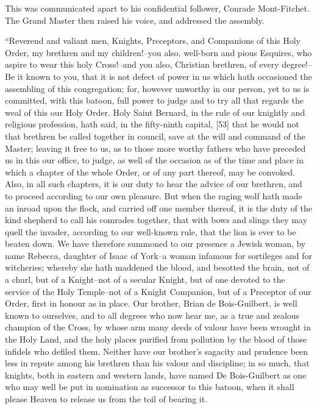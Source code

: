This was communicated apart to his confidential follower, Conrade
Mont-Fitchet. The Grand Master then raised his voice, and addressed the
assembly.

``Reverend and valiant men, Knights, Preceptors, and Companions of this
Holy Order, my brethren and my children!--you also, well-born and pious
Esquires, who aspire to wear this holy Cross!--and you also, Christian
brethren, of every degree!--Be it known to you, that it is not defect of
power in us which hath occasioned the assembling of this congregation;
for, however unworthy in our person, yet to us is committed, with this
batoon, full power to judge and to try all that regards the weal of this
our Holy Order. Holy Saint Bernard, in the rule of our knightly and
religious profession, hath said, in the fifty-ninth capital, {[}53{]}
that he would not that brethren be called together in council, save at
the will and command of the Master; leaving it free to us, as to those
more worthy fathers who have preceded us in this our office, to judge,
as well of the occasion as of the time and place in which a chapter of
the whole Order, or of any part thereof, may be convoked. Also, in all
such chapters, it is our duty to hear the advice of our brethren, and to
proceed according to our own pleasure. But when the raging wolf hath
made an inroad upon the flock, and carried off one member thereof, it is
the duty of the kind shepherd to call his comrades together, that with
bows and slings they may quell the invader, according to our well-known
rule, that the lion is ever to be beaten down. We have therefore
summoned to our presence a Jewish woman, by name Rebecca, daughter of
Isaac of York--a woman infamous for sortileges and for witcheries;
whereby she hath maddened the blood, and besotted the brain, not of a
churl, but of a Knight--not of a secular Knight, but of one devoted to
the service of the Holy Temple--not of a Knight Companion, but of a
Preceptor of our Order, first in honour as in place. Our brother, Brian
de Bois-Guilbert, is well known to ourselves, and to all degrees who now
hear me, as a true and zealous champion of the Cross, by whose arm many
deeds of valour have been wrought in the Holy Land, and the holy places
purified from pollution by the blood of those infidels who defiled them.
Neither have our brother's sagacity and prudence been less in repute
among his brethren than his valour and discipline; in so much, that
knights, both in eastern and western lands, have named De Bois-Guilbert
as one who may well be put in nomination as successor to this batoon,
when it shall please Heaven to release us from the toil of bearing it.
